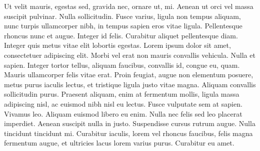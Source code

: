 Ut velit mauris, egestas sed, gravida nec, ornare ut, mi. Aenean ut orci vel massa suscipit pulvinar. Nulla sollicitudin. Fusce varius, ligula non tempus aliquam, nunc turpis ullamcorper nibh, in tempus sapien eros vitae ligula. Pellentesque rhoncus nunc et augue. Integer id felis. Curabitur aliquet pellentesque diam. Integer quis metus vitae elit lobortis egestas. Lorem ipsum dolor sit amet, consectetuer adipiscing elit. Morbi vel erat non mauris convallis vehicula. Nulla et sapien. Integer tortor tellus, aliquam faucibus, convallis id, congue eu, quam. Mauris ullamcorper felis vitae erat. Proin feugiat, augue non elementum posuere, metus purus iaculis lectus, et tristique ligula justo vitae magna.
Aliquam convallis sollicitudin purus. Praesent aliquam, enim at fermentum mollis, ligula massa adipiscing nisl, ac euismod nibh nisl eu lectus. Fusce vulputate sem at sapien. Vivamus leo. Aliquam euismod libero eu enim. Nulla nec felis sed leo placerat imperdiet. Aenean suscipit nulla in justo. Suspendisse cursus rutrum augue. Nulla tincidunt tincidunt mi. Curabitur iaculis, lorem vel rhoncus faucibus, felis magna fermentum augue, et ultricies lacus lorem varius purus. Curabitur eu amet.

